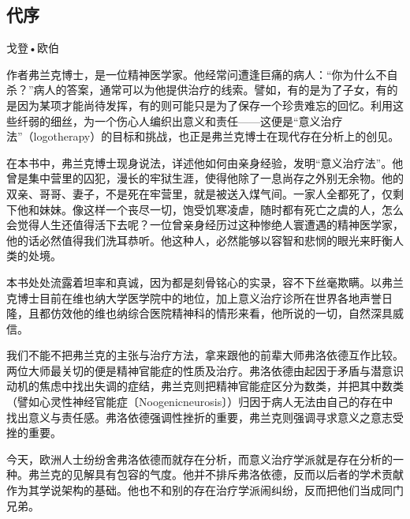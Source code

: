 \documentclass[11pt,oneside]{book}
\begin{document}
\frontmatter   

\author{V•E•弗兰克尔}
\titleLC

\setcounter{tocdepth}{1}    
\tableofcontents

\begin{common-format}
\mainmatter 

\chapter*{代序}
{\large 戈登•欧伯}

作者弗兰克博士，是一位精神医学家。他经常问遭逢巨痛的病人：“你为什么不自杀？”病人的答案，通常可以为他提供治疗的线索。譬如，有的是为了子女，有的是因为某项才能尚待发挥，有的则可能只是为了保存一个珍贵难忘的回忆。利用这些纤弱的细丝，为一个伤心人编织出意义和责任——这便是“意义治疗法”（logotherapy）的目标和挑战，也正是弗兰克博士在现代存在分析上的创见。

在本书中，弗兰克博士现身说法，详述他如何由亲身经验，发明“意义治疗法”。他曾是集中营里的囚犯，漫长的牢狱生涯，使得他除了一息尚存之外别无余物。他的双亲、哥哥、妻子，不是死在牢营里，就是被送入煤气间。一家人全都死了，仅剩下他和妹妹。像这样一个丧尽一切，饱受饥寒凌虐，随时都有死亡之虞的人，怎么会觉得人生还值得活下去呢？一位曾亲身经历过这种惨绝人寰遭遇的精神医学家，他的话必然值得我们洗耳恭听。他这种人，必然能够以容智和悲悯的眼光来盱衡人类的处境。

本书处处流露着坦率和真诚，因为都是刻骨铭心的实录，容不下丝毫欺瞒。以弗兰克博士目前在维也纳大学医学院中的地位，加上意义治疗诊所在世界各地声誉日隆，且都仿效他的维也纳综合医院精神科的情形来看，他所说的一切，自然深具威信。

我们不能不把弗兰克的主张与治疗方法，拿来跟他的前辈大师弗洛依德互作比较。两位大师最关切的便是精神官能症的性质及治疗。弗洛依德由起因于矛盾与潜意识动机的焦虑中找出失调的症结，弗兰克则把精神官能症区分为数类，并把其中数类（譬如心灵性神经官能症〔Noogenicneurosis〕）归因于病人无法由自己的存在中找出意义与责任感。弗洛依德强调性挫折的重要，弗兰克则强调寻求意义之意志受挫的重要。

今天，欧洲人士纷纷舍弗洛依德而就存在分析，而意义治疗学派就是存在分析的一种。弗兰克的见解具有包容的气度。他并不排斥弗洛依德，反而以后者的学术贡献作为其学说架构的基础。他也不和别的存在治疗学派闹纠纷，反而把他们当成同门兄弟。


\end{common-format}
\end{document}
